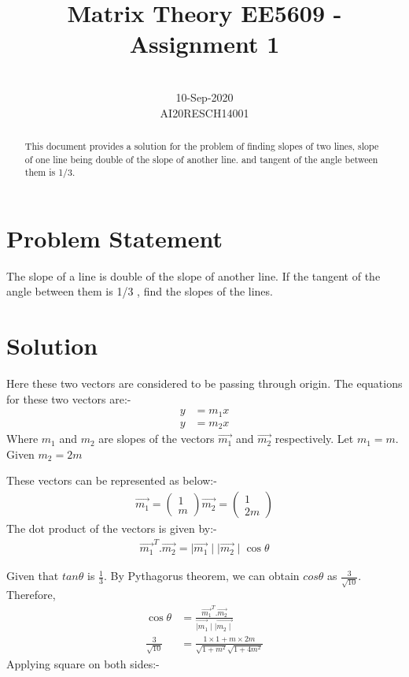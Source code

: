 \documentclass[conference]{IEEEtran}
\newcommand{\myvec}[1]{\ensuremath{\begin{pmatrix}#1\end{pmatrix}}}
\begin{document}
\title{Matrix Theory EE5609 - Assignment 1\\ 
}

\author{
 \\
10-Sep-2020\\
AI20RESCH14001\\
 }

\maketitle

\begin{abstract}
This document provides a solution for the problem of finding slopes of two lines,  slope of one line being double of the slope of another line. and tangent of the angle between them is 1/3.
\end{abstract}

\section{Problem Statement}
The slope of a line is double of the slope of another line. If the tangent of the angle between them is 1/3 , find the slopes of the lines.

\section{Solution}
Here these two vectors are considered to be passing through origin. The equations for these two vectors are:-
\begin{align}
 y &= m_{1}x\\ 
 y &= m_{2}x
\end{align}
Where  $m_{1}$   and  $ m_{2}$ are slopes of the vectors $\vec{m_{1}}$   and    $\vec{m_{2}}$ respectively.
Let  $m_{1} = m$. Given  $m_{2} = 2m$

These vectors can be represented as below:-
\begin{align}
\vec{m_{1}} =\myvec{ 1 \\m }
\vec{m_{2}} =\myvec{1\\2m}
 \end{align}
The dot product of the vectors is given by:-
\begin{align}
 \vec{m_{1}} ^T .   \vec{m_{2}} = \mid  \vec{ m_{1}}\mid \mid  \vec{m_{2}}\mid  \cos \theta
\end{align}

Given that $tan \theta$ is $\frac{1}{3}$. By Pythagorus theorem, we can obtain $cos \theta$ as $\frac{3}{\sqrt{10}}$.
Therefore,
\begin{align}
\cos \theta &= \frac{\vec{m_{1}}^T  .  \vec{m_{2}}}{\vec{\mid m_{1}}\mid \mid \vec{m_{2}\mid}}\\
\frac{3}{\sqrt{10}} &=  \frac{1 \times 1 + {m \times 2m}}{{\sqrt{1 + m^2}\sqrt{1 +4 m^2}}}
\end{align}
Applying square on both sides:-
\end{document}
